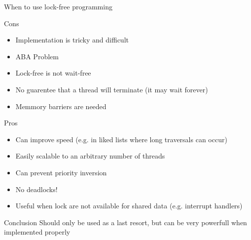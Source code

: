 \begin{frame}[allowframebreaks]{When to use lock-free programming}
    \begin{block}{Cons}
    \begin{itemize}
        \item Implementation is tricky and difficult
        \item ABA Problem
        \item Lock-free is not wait-free
        \item No guarentee that a thread will terminate (it may wait forever)
        \item Memmory barriers are needed
    \end{itemize}
    \end{block}

    \begin{block}{Pros}
    \begin{itemize}
        \item Can improve speed (e.g. in liked lists where long traversals can occur)
        \item Easily scalable to an arbitrary number of threads
        \item Can prevent priority inversion
        \item \textcolor{ReneOrange}{No deadlocks!}
        \item Useful when lock are not available for shared data (e.g. interrupt handlers)
    \end{itemize}
    \end{block}
    
    \begin{exampleblock}{Conclusion}
        Should only be used as a last resort, but can be very powerfull when implemented properly
    \end{exampleblock}
\end{frame}
